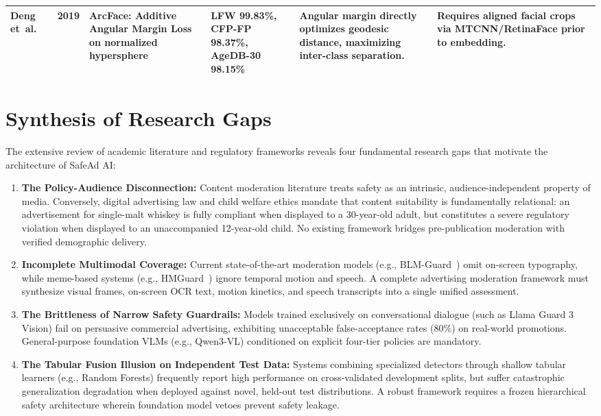 \documentclass[12pt,a4paper]{report}
\begin{document}
\begin{table}[htbp]
\begin{tabular}{|p{1.4cm}|c|p{3.2cm}|p{3.4cm}|p{4.2cm}|p{3.4cm}|}
Deng et~al.~\cite{deng2019arcface} & 2019 &
ArcFace: Additive Angular Margin Loss on normalized hypersphere &
LFW 99.83\%, CFP-FP 98.37\%, AgeDB-30 98.15\% &
Angular margin directly optimizes geodesic distance, maximizing inter-class separation. &
Requires aligned facial crops via MTCNN/RetinaFace prior to embedding. \\ \hline

\end{tabular}
\end{table}

\section{Synthesis of Research Gaps}

The extensive review of academic literature and regulatory frameworks reveals four fundamental research gaps that motivate the architecture of SafeAd AI:
\begin{enumerate}
    \item \textbf{The Policy-Audience Disconnection:} Content moderation literature treats safety as an intrinsic, audience-independent property of media. Conversely, digital advertising law and child welfare ethics mandate that content suitability is fundamentally relational: an advertisement for single-malt whiskey is fully compliant when displayed to a 30-year-old adult, but constitutes a severe regulatory violation when displayed to an unaccompanied 12-year-old child. No existing framework bridges pre-publication moderation with verified demographic delivery.
    \item \textbf{Incomplete Multimodal Coverage:} Current state-of-the-art moderation models (e.g., BLM-Guard~\cite{blmguard2026}) omit on-screen typography, while meme-based systems (e.g., HMGuard~\cite{zhuang2025}) ignore temporal motion and speech. A complete advertising moderation framework must synthesize visual frames, on-screen OCR text, motion kinetics, and speech transcripts into a single unified assessment.
    \item \textbf{The Brittleness of Narrow Safety Guardrails:} Models trained exclusively on conversational dialogue (such as Llama Guard 3 Vision) fail on persuasive commercial advertising, exhibiting unacceptable false-acceptance rates ($80\%$) on real-world promotions. General-purpose foundation VLMs (e.g., Qwen3-VL) conditioned on explicit four-tier policies are mandatory.
    \item \textbf{The Tabular Fusion Illusion on Independent Test Data:} Systems combining specialized detectors through shallow tabular learners (e.g., Random Forests) frequently report high performance on cross-validated development splits, but suffer catastrophic generalization degradation when deployed against novel, held-out test distributions. A robust framework requires a frozen hierarchical safety architecture wherein foundation model vetoes prevent safety leakage.
\end{enumerate}
\end{document}
